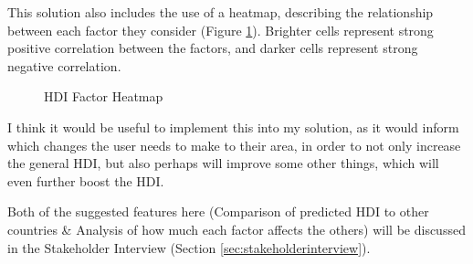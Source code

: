 \documentclass[12pt]{report}
\begin{document}
This solution also includes the use of a heatmap, describing the relationship between each factor they consider (Figure \ref{fig:es1c}). Brighter cells represent strong positive correlation between the factors, and darker cells represent strong negative correlation.
\begin{figure}[H]
\centering
{}
\caption{HDI Factor Heatmap}\label{fig:es1c}
\end{figure}
I think it would be useful to implement this into my solution, as it would inform which changes the user needs to make to their area, in order to not only increase the general HDI, but also perhaps will improve some other things, which will even further boost the HDI.

Both of the suggested features here (Comparison of predicted HDI to other countries \& Analysis of how much each factor affects the others) will be discussed in the Stakeholder Interview (Section \ref{sec:stakeholderinterview}).
\end{document}

